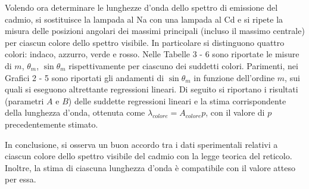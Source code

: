 \documentclass{article}
\begin{document}
Volendo ora determinare le lunghezze d'onda dello spettro di emissione del cadmio, si sostituisce la lampada al Na con una lampada al Cd e si ripete la misura delle posizioni angolari dei massimi principali (incluso il massimo centrale) per ciascun colore dello spettro visibile. In particolare si distinguono quattro colori: indaco, azzurro, verde e rosso. Nelle Tabelle 3 - 6 sono riportate le misure di $m$, $\theta_m$, $\sin \theta_m$ rispettivamente per ciascuno dei suddetti colori. Parimenti, nei Grafici 2 - 5 sono riportati gli andamenti di $\sin \theta_m$ in funzione dell'ordine $m$, sui quali si eseguono altrettante regressioni lineari. Di seguito si riportano i risultati (parametri $A$ e $B$) delle suddette regressioni lineari e la stima corrispondente della lunghezza d'onda, ottenuta come $\lambda_{colore}= A_{colore} p$, con il valore di $p$ precedentemente stimato.

In conclusione, si osserva un buon accordo tra i dati sperimentali relativi a ciascun colore dello spettro visibile del cadmio con la legge teorica del reticolo. Inoltre, la stima di ciascuna lunghezza d'onda è compatibile con il valore atteso per essa.




 
	
	
\end{document}
